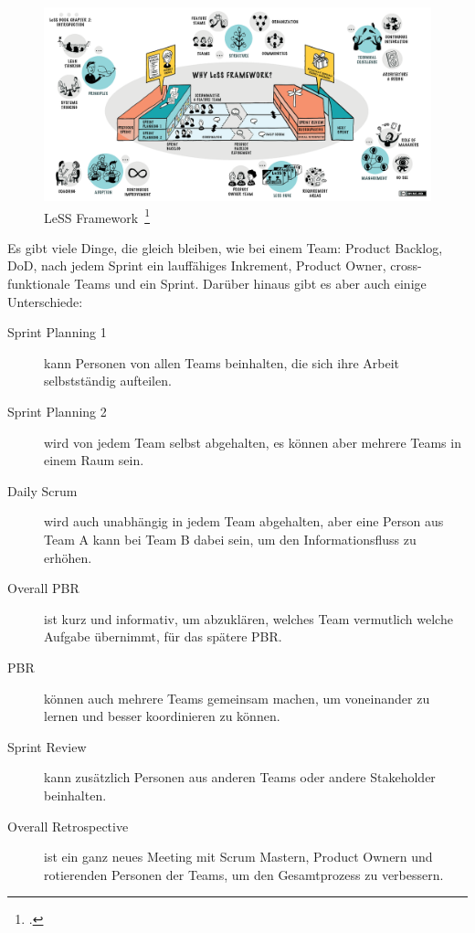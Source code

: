 \begin{savenotes}
  \begin{figure}[H] 
    \centering
       \includegraphics[width=1.0\textwidth]{img/less.png}
    \caption[\ac{LeSS} Framework]{\ac{LeSS} Framework~\footcite{less_framework}}\label{fig:less}
  \end{figure}
\end{savenotes}

Es gibt viele Dinge, die gleich bleiben, wie bei einem Team: Product Backlog, \ac{DoD}, nach jedem Sprint ein lauffähiges Inkrement, Product Owner, cross-funktionale Teams und ein Sprint.
Darüber hinaus gibt es aber auch einige Unterschiede:

\begin{description}
  \item[Sprint Planning 1] kann Personen von allen Teams beinhalten, die sich ihre Arbeit selbstständig aufteilen.
  \item[Sprint Planning 2] wird von jedem Team selbst abgehalten, es können aber mehrere Teams in einem Raum sein.
  \item[Daily Scrum] wird auch unabhängig in jedem Team abgehalten, aber eine Person aus Team A kann bei Team B dabei sein, um den Informationsfluss zu erhöhen.
  \item[Overall \ac{PBR}] ist kurz und informativ, um abzuklären, welches Team vermutlich welche Aufgabe übernimmt, für das spätere \ac{PBR}.
  \item[\ac{PBR}] können auch mehrere Teams gemeinsam machen, um voneinander zu lernen und besser koordinieren zu können.
  \item[Sprint Review] kann zusätzlich Personen aus anderen Teams oder andere Stakeholder beinhalten.
  \item[Overall Retrospective] ist ein ganz neues Meeting mit Scrum Mastern, Product Ownern und rotierenden Personen der Teams, um den Gesamtprozess zu verbessern.
\end{description}

